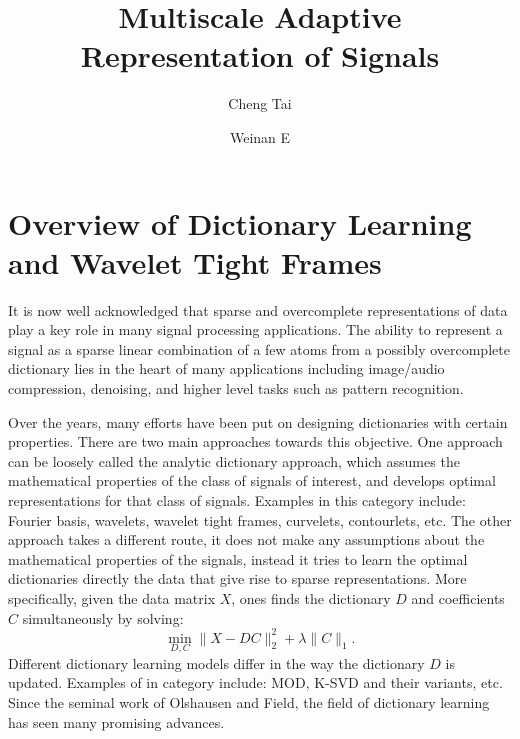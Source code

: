 \documentclass[a4paper]{article}
\title{Multiscale Adaptive Representation of Signals}
\author[1]{Cheng Tai}
\author[2]{Weinan E}
\affil[1]{PACM, Princeton University}
\affil[2]{Department of Mathematics and PACM, Princeton University}
\begin{document}
\newtheorem{lem}{Lemma}
\newtheorem{prop}{Proposition}
\newtheorem{rem}{Remark}
\newtheorem{thm}{Theorem}
\renewcommand{\a}{\mathbf{a}}
\renewcommand{\v}{\mathbf{v}}

\date{}
\maketitle
{}

\section{Overview of Dictionary Learning and Wavelet Tight Frames}
It is now well acknowledged that sparse and overcomplete representations of data play a key role in many signal processing applications. The ability to represent a signal as a sparse linear combination of a few atoms from a possibly overcomplete dictionary lies in the heart of many applications including image/audio compression, denoising, and higher level tasks such as pattern recognition.

Over the years, many efforts have been put on designing dictionaries with certain properties. There are two main approaches towards this objective.  One approach can be loosely called the analytic dictionary approach, which assumes the mathematical properties of the class of signals of interest, and develops optimal representations for that class of signals. Examples in this category include: Fourier basis, wavelets, wavelet tight frames\cite{daubechies2003framelets}, curvelets\cite{candes2000curvelets}, contourlets\cite{do2002contourlets}, etc. The other approach takes a different route, it does not make any assumptions about the mathematical properties of the signals, instead it tries to learn the optimal dictionaries directly the data that give rise to sparse representations. More specifically, given the data matrix $X$, ones finds the dictionary $D$ and coefficients $C$ simultaneously by solving:
\begin{equation}
	\min_{D,C} \|X-DC\|_2^2 +\lambda \|C\|_1.
\end{equation}
Different dictionary learning models differ in the way the dictionary $D$ is updated. Examples of in category include: MOD\cite{engan1999method}, K-SVD\cite{aharon2006svd} and their variants, etc. Since the seminal work of Olshausen and Field\cite{olshausen1996emergence}, the field of dictionary learning has seen many promising advances.
\end{document}
